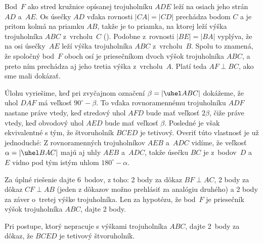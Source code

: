 {%
Bod~$F$ ako stred kružnice opísanej trojuholníku $ADE$ leží na osiach
jeho strán $AD$ a~$AE$. Os úsečky $AD$ vďaka rovnosti
$|CA|=|CD|$ prechádza bodom $C$ a je pritom kolmá na priamku $AB$,
takže je to priamka, na ktorej leží výška trojuholníka $ABC$ z~vrcholu~$C$ (\obr). Podobne z~rovnosti $|BE|=|BA|$ vyplýva, že na osi úsečky~$AE$
leží výška trojuholníka $ABC$ z~vrcholu~$B$. Spolu to znamená,
že spoločný bod~$F$ oboch osí je priesečníkom dvoch výšok trojuholníka $ABC$, a
preto ním prechádza aj jeho tretia výška z~vrcholu~$A$. Platí teda
$AF\perp BC$, ako sme mali dokázať.
%

\ineriesenie
Úlohu vyriešime, keď pri zvyčajnom označení $\beta=|\uhel ABC|$
dokážeme, že uhol $DAF$ má veľkosť $90^\circ-\beta$. To vďaka
rovnoramennému trojuholníku $ADF$ nastane práve vtedy, keď stredový uhol
$AFD$ bude mať veľkosť $2\beta$, čiže práve vtedy, keď obvodový uhol
$AED$ bude mať veľkosť $\beta$. Posledné je však ekvivalentné s tým,
že štvoruholník $BCED$ je tetivový. Overiť túto vlastnosť je už jednoduché:
Z rovnoramenných trojuholníkov $AEB$ a~$ADC$ vidíme, že veľkosť
$\alpha=|\uhel BAC|$ majú aj uhly $AEB$ a~$ADC$, takže úsečku $BC$ je z~bodov~$D$ a~$E$ vidno pod tým istým uhlom $180^\circ-\alpha$.

\nobreak\medskip\petit\noindent
Za úplné riešenie dajte 6~bodov, z toho: 2 body za dôkaz $BF\perp AC$,
2 body za dôkaz $CF\perp AB$ (jeden z dôkazov možno prehlásiť za analógiu
druhého) a 2 body za záver o~tretej výške trojuholníka. Len za hypotézu, že bod~$F$ je
priesečník výšok trojuholníka $ABC$, dajte 2 body.

Pri postupe, ktorý nepracuje s výškami trojuholníka $ABC$,
dajte 2~body za dôkaz, že $BCED$ je tetivový štvoruholník.
\endpetit
}


